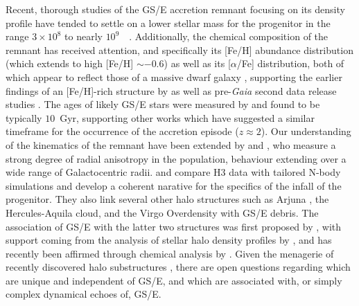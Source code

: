 Recent, thorough studies of the GS/E accretion remnant focusing on its density profile have tended to settle on a lower stellar mass for the progenitor in the range $3\times10^{8}$ to nearly $10^{9}$~\Msun\ \parencite{mackereth19a,mackereth20,naidu21,han22}. Additionally, the chemical composition of the remnant has received attention, and specifically its [Fe/H] abundance distribution (which extends to high [Fe/H] $\sim -0.6$) as well as its [$\alpha$/Fe] distribution, both of which appear to reflect those of a massive dwarf galaxy \parencite{myeong19,monty20,mackereth19a,feuillet20,matsuno21,hasselquist21,buder22,gaiadr3_chemodynamics,horta23a}, supporting the earlier findings of an [Fe/H]-rich structure by \textcite{belokurov18} as well as pre-\textit{Gaia} second data release studies \parencite{nissen10,bonaca17,hayes18}. The ages of likely GS/E stars were measured by \textcite{montalban21} and found to be typically $10$~Gyr, supporting other works which have suggested a similar timeframe for the occurrence of the accretion episode ($z\approx2$). Our understanding of the kinematics of the remnant have been extended by \textcite{lancaster19} and \textcite{iorio21}, who measure a strong degree of radial anisotropy in the population, behaviour extending over a wide range of Galactocentric radii. \textcite{naidu21} and \textcite{chandra23} compare H3 data with tailored N-body simulations and develop a coherent narative for the specifics of the infall of the progenitor. They also link several other halo structures such as Arjuna \parencite{naidu20}, the Hercules-Aquila cloud, and the Virgo Overdensity with GS/E debris. The association of GS/E with the latter two structures was first proposed by \textcite{simion19}, with support coming from the analysis of stellar halo density profiles by \textcite{iorio19}, and has recently been affirmed through chemical analysis by \textcite{perottoni22}. Given the menagerie of recently discovered halo substructures \parencite[see ][ for censuses of the major ones]{helmi20,naidu21,horta23a}, there are open questions regarding which are unique and independent of GS/E, and which are associated with, or simply complex dynamical echoes of, GS/E. 


